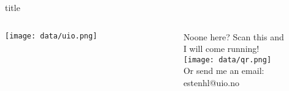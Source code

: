 \documentclass[final, pt]{beamer}
\begin{document}
    \def\authorfont{\large}
    \def\sectionwidth{0.235\textwidth}

    \newcommand{\postersection}[3]{
        \begin{minipage}[t][#2][t]{\textwidth}
            \LARGE{\textcolor{uiored}{#1}}\\[-0.5cm]
            \rule{\textwidth}{1pt}\\[0.3cm]
            \fontsize{24}{23}\selectfont
            #3
        \end{minipage}
    }

    \begin{frame}[t]
        \thispagestyle{empty}

        \begin{beamercolorbox}[sep=0em,wd=\textwidth]{title}
            \begin{columns}
                \begin{column}{0.2\textwidth}
                    \hspace{1.2cm}
                    \texttt{[image: data/uio.png]}
                \end{column}
                \begin{column}{0.6\textwidth}
                    \centering\\[2.3cm]
                    \vspace{2.3cm}
                \end{column}
                \begin{column}{0.2\textwidth}
                    \hfill
                    \begin{minipage}{0.6\textwidth}
                        \centering
                        Noone here? Scan this and\\[-0.2cm]
                        I will come running!\\[0.5cm]
                        \texttt{[image: data/qr.png]}\\
                        Or send me an email:\\[-0.2cm]
                        estenhl@uio.no
                    \end{minipage}
                    \hspace{1.2cm}
                \end{column}
            \end{columns}
        \end{beamercolorbox}


\end{frame}
\end{document}
